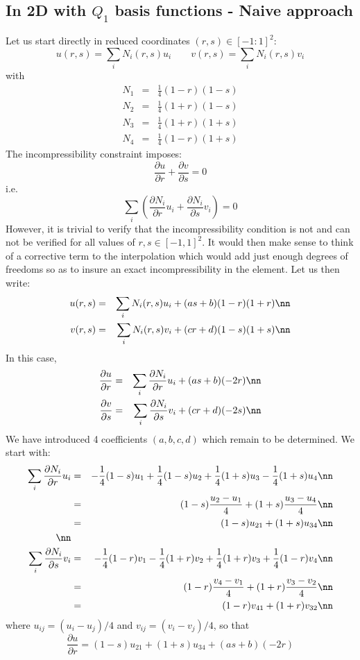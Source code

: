 \subsection{In 2D with $Q_1$ basis functions - Naive approach}

Let us start directly in reduced coordinates $(r,s)\in [-1:1]^2$:
\[
u(r,s)=\sum_i N_i(r,s) u_i
\quad
\quad
v(r,s)=\sum_i N_i(r,s) v_i
\]
with 
\begin{eqnarray}
N_1&=& \frac{1}{4}(1-r)(1-s)  \nonumber\\ 
N_2&=& \frac{1}{4}(1+r)(1-s)  \nonumber\\ 
N_3&=& \frac{1}{4}(1+r)(1+s)  \nonumber\\ 
N_4&=& \frac{1}{4}(1-r)(1+s)  \nonumber
\end{eqnarray}
The incompressibility constraint imposes:
\[
\frac{\partial u}{\partial r}+
\frac{\partial v}{\partial s}=0
\]
i.e.
\[
\sum_i \left(  
\frac{\partial N_i}{\partial r} u_i+
\frac{\partial N_i}{\partial s} v_i
\right)
=0
\]
However, it is trivial to verify that the incompressibility 
condition is not and can not be verified for all values of  
$r,s \in [-1,1]^2$.
It would then make sense to think of a corrective term to the interpolation
which would add just enough degrees of freedoms so as to insure an exact
incompressibility in the element. 
Let us then write:
\begin{eqnarray}
u(r,s)&=&\sum_i N_i(r,s) u_i + (a s + b)(1-r)(1+r) \nn\\
v(r,s)&=&\sum_i N_i(r,s) v_i + (c r + d)(1-s)(1+s) \nn
\end{eqnarray}
In this case,
\begin{eqnarray}
\frac{\partial u}{\partial r}&=&\sum_i \frac{\partial N_i}{\partial r} u_i + (a s + b) (-2r) \nn\\
\frac{\partial v}{\partial s}&=&\sum_i \frac{\partial N_i}{\partial s} v_i + (c r + d)(-2s) \nn
\end{eqnarray}
We have introduced 4 coefficients  $(a,b,c,d)$ which remain to be determined. 
We start with:
\begin{eqnarray}
\sum_i \frac{\partial N_i}{\partial r} u_i 
&=& -\frac{1}{4} (1-s) u_1 + \frac{1}{4} (1-s) u_2 +\frac{1}{4} (1+s) u_3 -\frac{1}{4} (1+s) u_4 \nn\\
&=& (1-s) \frac{u_2-u_1}{4} + (1+s) \frac{u_3-u_4}{4} \nn\\
&=& (1-s) u_{21} + (1+s) u_{34} \nn\\
\nn\\
\sum_i \frac{\partial N_i}{\partial s} v_i 
&=& -\frac{1}{4} (1-r) v_1 - \frac{1}{4} (1+r) v_2 +\frac{1}{4} (1+r) v_3 +\frac{1}{4} (1-r) v_4 \nn\\
&=& (1-r) \frac{v_4-v_1}{4} + (1+r)\frac{v_3-v_2}{4} \nn\\
&=& (1-r) v_{41} + (1+r) v_{32} \nn
\end{eqnarray}
where $u_{ij}=(u_i-u_j)/4$ and $v_{ij}=(v_i-v_j)/4$, so that
\[
\frac{\partial u}{\partial r}=
(1-s) u_{21} + (1+s) u_{34} 
+ (a s + b) (-2r)
\]

